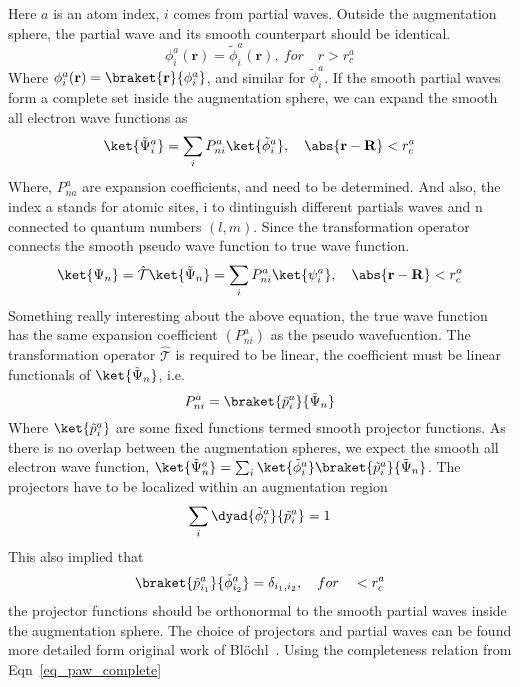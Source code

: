 Here $a$ is an atom index, $i$ comes from partial waves. Outside the augmentation sphere, the partial wave and its smooth counterpart should be identical.
\begin{equation}
\phi_i^a(\mathbf{r}) = \tilde{\phi}_i^a(\mathbf{r}),\  for \quad r > r_c^a
\end{equation} 
Where $\phi_i^a(\mathbf{r})=\braket{\mathbf{r}}{\phi_i^a}$, and similar for $\tilde{\phi}_i^a$. If the smooth partial waves form a complete set inside the augmentation sphere, we can expand the smooth all electron wave functions as 
\begin{equation}
\ket{\tilde{\Psi}_i^a} = \sum_i P_{ni}^a \ket{\tilde{\phi}_i^a}, \quad \abs{\mathbf{r}-\mathbf{R}} < r_c^a
\end{equation}
Where, $P_{na}^a$ are expansion coefficients, and need to be determined. And also, the index a stands for atomic sites, i to dintinguish different partials waves and n connected to quantum numbers $(l,m)$. Since the transformation operator connects the smooth pseudo wave function to true wave function.
\begin{equation}
\ket{\Psi_n} = \hat{\mathcal{T}} \ket{\tilde{\Psi}_n} = \sum_i P_{ni}^a \ket{\psi_i^a}, \quad \abs{\mathbf{r}-\mathbf{R}} < r_c^a
\end{equation} 
Something really interesting about the above equation, the true wave function has the same expansion coefficient $(P_{ni}^a)$ as the pseudo wavefucntion. The transformation operator $\hat{\mathcal{T}}$ is required to be linear, the coefficient must be linear functionals of $\ket{\tilde{\Psi}_n}$, i.e.
\begin{equation}
P_{ni}^a = \braket{\tilde{p}_i^a}{\tilde{\Psi}_n}
\end{equation}
Where $\ket{\tilde{p}_i^a}$ are some fixed functions termed smooth projector functions. As there is no overlap between the augmentation spheres, we expect the smooth all electron wave function, $\ket{\tilde{\Psi}_n^a} = \sum_i \ket{\tilde{\phi}_i^a} \braket{\tilde{p}_i^a}{\tilde{\Psi}_n}$. The projectors have to be localized within an augmentation region
\begin{equation}
\label{eq_paw_complete}
	\sum_i \dyad{\tilde{\phi}_i^a}{\tilde{p}_i^a} = 1
\end{equation}
This also implied that
\begin{equation}
	\braket{\tilde{p}_{i_1}^a}{\tilde{\phi}_{i_2}^a} = \delta_{i_1,i_2},\quad for \quad < r_c^a
\end{equation}
the projector functions should be orthonormal to the smooth partial waves inside the augmentation sphere. The choice of projectors and partial waves can be found more detailed form original work of Bl\"ochl~\cite{blochl1994projector}. Using the completeness relation from Eqn~\ref{eq_paw_complete}
